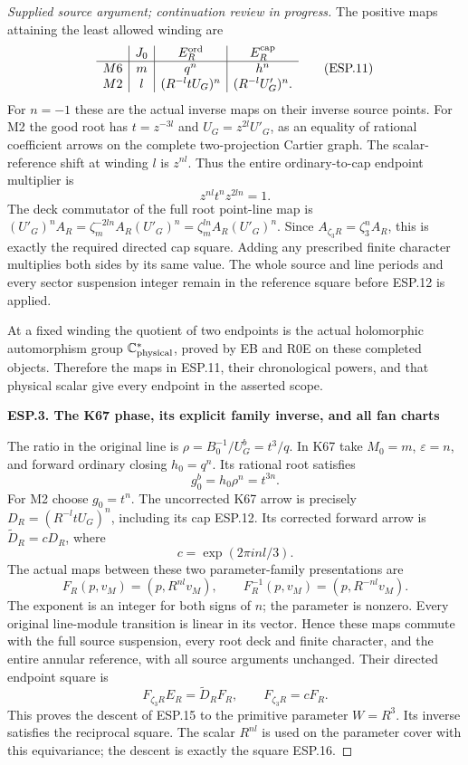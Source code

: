 \begin{proof}[Supplied source argument; continuation review in progress]
The positive maps attaining the least allowed winding are
\[
 \begin{array}{c|c|c|c}
 &J_0&E_R^{\rm ord}&E_R^{\rm cap}\\\hline
 M6&m&q^n&h^n\\
 M2&l&(R^{-l}tU_G)^n&(R^{-l}U'_G)^n.
 \end{array}
 \tag{ESP.11}
\]
For \(n=-1\) these are the actual inverse maps on their inverse
source points. For M2 the good root has
\(t=z^{-3l}\) and \(U_G=z^{2l}U'_G\), as an equality of
rational coefficient arrows on the complete two-projection Cartier
graph. The scalar-reference shift at winding \(l\) is \(z^{nl}\).
Thus the entire ordinary-to-cap endpoint multiplier is
\[
                         z^{nl}t^nz^{2ln}=1.
 \tag{ESP.12}
\]
The deck commutator of the full root point-line map is
\((U'_G)^n A_R=\zeta_m^{-2ln}A_R(U'_G)^n
=\zeta_m^{ln}A_R(U'_G)^n\). Since
\(A_{\zeta_3R}=\zeta_3^nA_R\), this is exactly the required
directed cap square. Adding any prescribed finite character multiplies
both sides by its same value. The whole source and line periods and
every sector suspension integer remain in the reference square before
ESP.12 is applied.

At a fixed winding the quotient of two endpoints is the actual
holomorphic automorphism group \(\mathbb C^*_{\rm physical}\),
proved by EB and R0E on these completed objects. Therefore the maps
in ESP.11, their chronological powers, and that physical scalar
give every endpoint in the asserted scope.

\par

\medskip\noindent\textbf{ESP.3. The K67 phase, its explicit family inverse, and all fan charts}

\par\nobreak

The ratio in the original line is
\(\rho=B_0^{-1}/U_G^b=t^3/q\). In K67 take
\(M_0=m\), \(\varepsilon=n\), and forward ordinary closing
\(h_0=q^n\). Its rational root satisfies
\[
                         g_0^b=h_0\rho^n=t^{3n}.
 \tag{ESP.13}
\]
For M2 choose \(g_0=t^n\). The uncorrected K67 arrow is precisely
\(D_R=(R^{-l}tU_G)^n\), including its cap ESP.12. Its corrected
forward arrow is \(\widetilde D_R=cD_R\), where
\[
                     c=\exp(2\pi i nl/3).
 \tag{ESP.14}
\]
The actual maps between these two parameter-family presentations are
\[
 F_R(p,v_M)=(p,R^{nl}v_M),\qquad
 F_R^{-1}(p,v_M)=(p,R^{-nl}v_M).
 \tag{ESP.15}
\]
The exponent is an integer for both signs of \(n\); the parameter
is nonzero. Every original line-module transition is linear in its
vector. Hence these maps commute with the full source suspension,
every root deck and finite character, and the entire annular
reference, with all source arguments unchanged. Their directed
endpoint square is
\[
                  F_{\zeta_3R}E_R=\widetilde D_RF_R,
 \qquad F_{\zeta_3R}=cF_R.
 \tag{ESP.16}
\]
This proves the descent of ESP.15 to the primitive parameter
\(W=R^3\). Its inverse satisfies the reciprocal square. The scalar
\(R^{nl}\) is used on the parameter cover with this equivariance;
the descent is exactly the square ESP.16.


\end{proof}
